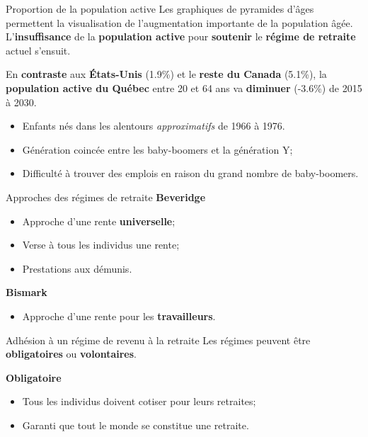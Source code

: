 \documentclass[10pt, french]{article}
\begin{document}
\begin{multicols*}{3}
\begin{conceptgen}{Proportion de la population active}
Les graphiques de pyramides d'âges permettent la visualisation de l'augmentation importante de la population âgée. L'\textbf{insuffisance} de la \textbf{population active} pour \textbf{soutenir} le \textbf{régime de retraite} actuel s'ensuit.

En \textbf{contraste} aux \textbf{États-Unis} (1.9\%) et le \textbf{reste du Canada} (5.1\%), la \textbf{population active du \textcolor{blue(pigment)}{Québec}} entre 20 et 64 ans va \textbf{diminuer} (-3.6\%) de 2015 à 2030. 
\end{conceptgen} 

\begin{itemize}[leftmargin = *]
	\item	Enfants nés dans les alentours \textit{approximatifs} de 1966 à 1976.
	\item	Génération coincée entre les baby-boomers et la génération Y;
	\item	Difficulté à trouver des emplois en raison du grand nombre de baby-boomers.
\end{itemize}

\begin{conceptgen}{Approches des régimes de retraite}
\textbf{Beveridge}
\begin{itemize}[leftmargin = *]
	\item	Approche d'une rente \textbf{universelle};
	\item	Verse à tous les individus une rente;
	\item	Prestations aux démunis.
\end{itemize}
\tcbline
\textbf{Bismark}
\begin{itemize}[leftmargin = *]
	\item	Approche d'une rente pour les \textbf{travailleurs}.
\end{itemize}
\end{conceptgen}

\begin{conceptgen}{Adhésion à un régime de revenu à la retraite}
Les régimes peuvent être \textbf{obligatoires} ou \textbf{volontaires}.

\textbf{Obligatoire}
\begin{itemize}[leftmargin = *]
	\item	Tous les individus doivent cotiser pour leurs retraites;
	\item	Garanti que tout le monde se constitue une retraite.
\end{itemize}


\end{conceptgen}
\end{multicols*}
\end{document}
